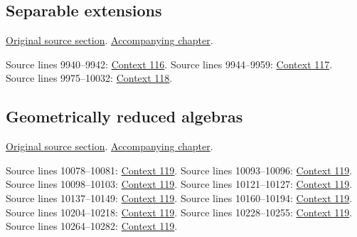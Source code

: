\subsection{Separable extensions}
\hypertarget{algebra-source-section-separability}{}
\noindent\href{https://github.com/stacks/stacks-project/blob/a04446e57ec1fbc252a871afcec7752fb2807b14/algebra.tex\#L9906}{Original source section}. \href{algebra.pdf\#nameddest=section-separability}{Accompanying chapter}.

\begin{AlgebraSourceRoutes}
 Source lines 9940--9942: \hyperlink{algebra-context-116}{Context 116}.
 Source lines 9944--9959: \hyperlink{algebra-context-117}{Context 117}.
 Source lines 9975--10032: \hyperlink{algebra-context-118}{Context 118}.
\end{AlgebraSourceRoutes}

\subsection{Geometrically reduced algebras}
\hypertarget{algebra-source-section-geometrically-reduced}{}
\noindent\href{https://github.com/stacks/stacks-project/blob/a04446e57ec1fbc252a871afcec7752fb2807b14/algebra.tex\#L10037}{Original source section}. \href{algebra.pdf\#nameddest=section-geometrically-reduced}{Accompanying chapter}.

\begin{AlgebraSourceRoutes}
 Source lines 10078--10081: \hyperlink{algebra-context-119}{Context 119}.
 Source lines 10093--10096: \hyperlink{algebra-context-119}{Context 119}.
 Source lines 10098--10103: \hyperlink{algebra-context-119}{Context 119}.
 Source lines 10121--10127: \hyperlink{algebra-context-119}{Context 119}.
 Source lines 10137--10149: \hyperlink{algebra-context-119}{Context 119}.
 Source lines 10160--10194: \hyperlink{algebra-context-119}{Context 119}.
 Source lines 10204--10218: \hyperlink{algebra-context-119}{Context 119}.
 Source lines 10228--10255: \hyperlink{algebra-context-119}{Context 119}.
 Source lines 10264--10282: \hyperlink{algebra-context-119}{Context 119}.
\end{AlgebraSourceRoutes}

